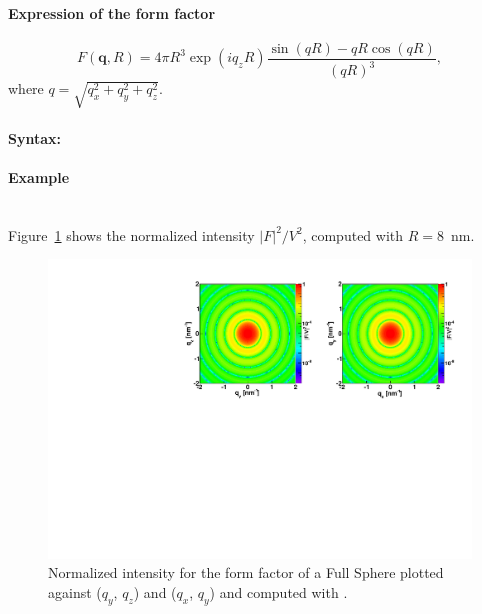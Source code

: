 \paragraph{Expression of the form factor}
\begin{equation*}
F(\mathbf{q},R) = 4\pi R^3 \exp(iq_z R)\frac{\sin(q R) - q R \cos(q R)}{(qR)^3},
\end{equation*}
where $q=\sqrt{q_x^2 + q_y^2 + q_z^2}$.

\paragraph{Syntax:} 

\newpage

\paragraph{Example}\mbox{}\\
Figure~\ref{fig:FFfSphereEx} shows the normalized intensity $|F|^2/V^2$, computed with $R=8$~nm.
\begin{figure}[h]
\begin{center}
\includegraphics[width=\textwidth]{Figures/figfffsphere}
\end{center}
\caption{Normalized intensity for the
  form factor of a Full Sphere plotted against ($q_y$, $q_z$) and ($q_x$, $q_y$) and computed with .}
\label{fig:FFfSphereEx}
\end{figure}


\newpage%
